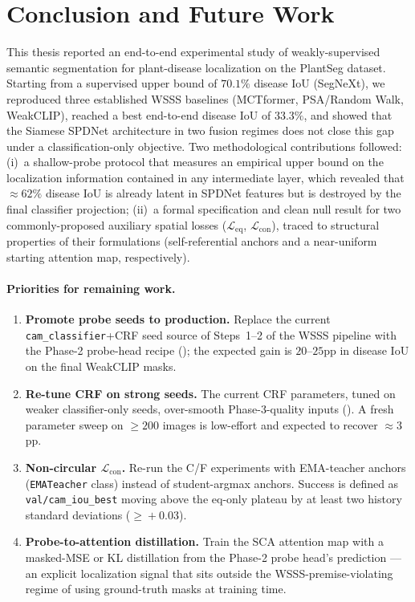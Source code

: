 \documentclass[11pt,a4paper]{article}
\newcommand{\Leq}{\mathcal{L}_{\mathrm{eq}}}
\newcommand{\Lcon}{\mathcal{L}_{\mathrm{con}}}
\begin{document}
\section{Conclusion and Future Work}
\label{sec:conclusion}

This thesis reported an end-to-end experimental study of weakly-supervised
semantic segmentation for plant-disease localization on the PlantSeg
dataset. Starting from a supervised upper bound of $70.1\%$ disease
IoU (SegNeXt), we reproduced three established WSSS baselines
(MCTformer, PSA/Random Walk, WeakCLIP), reached a best end-to-end
disease IoU of $33.3\%$, and showed that the Siamese SPDNet architecture
in two fusion regimes does not close this gap under a
classification-only objective. Two methodological contributions
followed: (i)~a shallow-probe protocol that measures an empirical
upper bound on the localization information contained in any
intermediate layer, which revealed that $\approx\!62\%$ disease IoU is
already latent in SPDNet features but is destroyed by the final
classifier projection; (ii)~a formal specification and clean null
result for two commonly-proposed auxiliary spatial losses
($\Leq$, $\Lcon$), traced to structural properties of their
formulations (self-referential anchors and a near-uniform starting
attention map, respectively).

\paragraph{Priorities for remaining work.}
\begin{enumerate}[leftmargin=*,itemsep=1pt]
\item \textbf{Promote probe seeds to production.} Replace the current
\texttt{cam\_classifier}+CRF seed source of Steps~1--2 of the WSSS
pipeline with the Phase-2 probe-head recipe
(); the expected gain is $20$--$25$pp in disease IoU on the
final WeakCLIP masks.
\item \textbf{Re-tune CRF on strong seeds.} The current CRF
parameters, tuned on weaker classifier-only seeds, over-smooth
Phase-3-quality inputs (). A fresh parameter sweep on
$\geq\!200$ images is low-effort and expected to recover $\approx\!3$pp.
\item \textbf{Non-circular $\Lcon$.} Re-run the C/F experiments with
EMA-teacher anchors (\texttt{EMATeacher} class) instead of student-argmax
anchors. Success is defined as \texttt{val/cam\_iou\_best} moving above
the eq-only plateau by at least two history standard deviations
($\geq\!+0.03$).
\item \textbf{Probe-to-attention distillation.} Train the SCA
attention map with a masked-MSE or KL distillation from the Phase-2
probe head's prediction — an explicit localization signal that sits
outside the WSSS-premise-violating regime of using ground-truth masks at
training time.
\end{enumerate}
\end{document}

